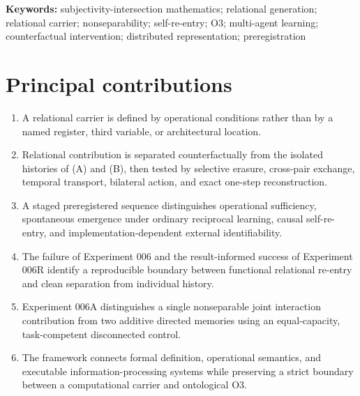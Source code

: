 \documentclass[11pt,a4paper]{article}
\begin{document}
\begin{abstract}
The results provide an executable operationalization of relational generation and self-re-entry. The measured carrier is not identified with ontological subjectivity; it is interpreted as a candidate \emph{operational projection} of relational properties associated with a third subjectivity, O3. The contribution is a framework in which relational generation can be defined, extracted, intervened upon, exchanged, reconstructed, and independently tested.
\end{abstract}

\noindent\textbf{Keywords:} subjectivity-intersection mathematics; relational generation; relational carrier; nonseparability; self-re-entry; O3; multi-agent learning; counterfactual intervention; distributed representation; preregistration

\section*{Principal contributions}
\begin{enumerate}
  \item A relational carrier is defined by operational conditions rather than by a named register, third variable, or architectural location.
  \item Relational contribution is separated counterfactually from the isolated histories of (A) and (B), then tested by selective erasure, cross-pair exchange, temporal transport, bilateral action, and exact one-step reconstruction.
  \item A staged preregistered sequence distinguishes operational sufficiency, spontaneous emergence under ordinary reciprocal learning, causal self-re-entry, and implementation-dependent external identifiability.
  \item The failure of Experiment 006 and the result-informed success of Experiment 006R identify a reproducible boundary between functional relational re-entry and clean separation from individual history.
  \item Experiment 006A distinguishes a single nonseparable joint interaction contribution from two additive directed memories using an equal-capacity, task-competent disconnected control.
  \item The framework connects formal definition, operational semantics, and executable information-processing systems while preserving a strict boundary between a computational carrier and ontological O3.
\end{enumerate}
\end{document}
